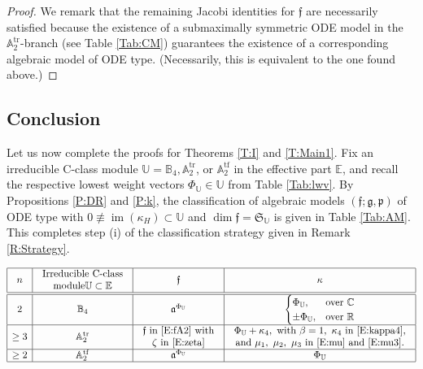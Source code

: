 \documentclass[10pt,a4paper]{amsart}
\DeclareMathOperator{\img}{im}
\DeclareMathOperator{\tf}{tf}
\DeclareMathOperator{\tr}{tr}
\newcommand{\g}{\mathfrak{g}}
\newcommand\fa{\mathfrak{a}}
\newcommand\ff{\mathfrak{f}}
\newcommand\fp{\mathfrak{p}}
\newcommand\fS{\mathfrak{S}}
\newcommand{\R}{\mathbb{R}}
\newcommand{\C}{\mathbb{C}}
\newcommand\bbE{\mathbb{E}}
\newcommand\bbU{\mathbb{U}}
\newcommand\bbA{\mathbb{A}}
\newcommand\bbB{\mathbb{B}}
\numberwithin{equation}{section}
\begin{document}
\begin{proof}
 We remark that the remaining Jacobi identities for $\ff$ are necessarily satisfied because the existence of a submaximally symmetric ODE model in the $\bbA_2^{\tr}$-branch (see Table \ref{Tab:CM}) guarantees the existence of a corresponding algebraic model of ODE type. (Necessarily, this is equivalent to the one found above.)
\end{proof}

\subsection{Conclusion} \label{S:ProvRes}

Let us now complete the proofs for Theorems \ref{T:I} and \ref{T:Main1}. Fix an irreducible C-class module $\bbU = \bbB_4, \bbA_2^{\tr}$, or $\bbA_2^{\tf}$ in the effective part $\bbE$, and recall the respective lowest weight vectors $\Phi_\bbU \in \bbU$ from Table \ref{Tab:lwv}. By Propositions \ref{P:DR} and \ref{P:k}, the classification of algebraic models $(\ff;\g,\fp)$ of ODE type with $0 \not \equiv \img(\kappa_H) \subset \bbU$ and $\dim \ff = \fS_{\bbU}$ is given in Table \ref{Tab:AM}. This completes step (i) of the classification strategy given in Remark \ref{R:Strategy}.

\begin{table}[h]\renewcommand{\arraystretch}{1.3}
\centering
$\begin{array}{|c|c|c|c|} \hline
n& \begin{array}{c}
\text{Irreducible C-class}\\ \text{module} \bbU\subset \bbE
\end{array} &\ff & \kappa \\ \hline\hline
2 & \bbB_4 & \fa^{\Phi_\bbU} & \begin{cases}
\Phi_\bbU, & \text{over}\ \C \\
\pm \Phi_\bbU, & \text{over}\ \R
\end{cases} \\\hline
\ge 3 & \bbA_2^{\tr} & \begin{array}{c}
\ff \ \text{in} \ \eqref{E:fA2} \ \text{with}\\
\zeta \ \text{in} \ \eqref{E:zeta}
\end{array} & \begin{array}{c}
\Phi_\bbU + \kappa_4,\ \text{with}\ \beta =1,\ \kappa_4 \ \text{in}\ \eqref{E:kappa4},\\
\text{and}\ \mu_1, \ \mu_2, \ \mu_3 \ \text{in} \ \eqref{E:mu} \ \text{and} \ \eqref{E:mu3}.
\end{array} \\ \hline
\ge 2 & \bbA_2^{\tf} & \fa^{\Phi_\bbU} & \Phi_\bbU\\ \hline
\end{array}$
\caption{Classification of algebraic models of ODE type with $0 \not \equiv \img(\kappa_H) \subset \bbU$ and $\dim \ff = \fS_\bbU$.}	
\label{Tab:AM}
\end{table}
\end{document}
